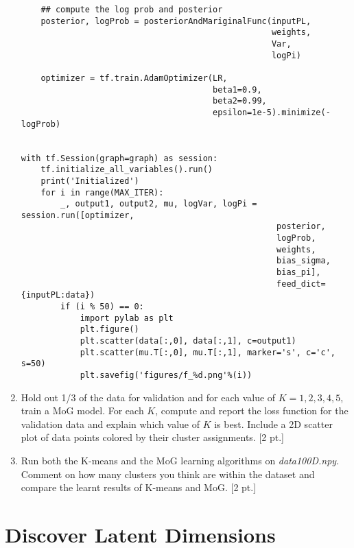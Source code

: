 \documentclass[12pt,letterpaper]{article}
\begin{document}
\begin{enumerate}
\begin{verbatim}
    ## compute the log prob and posterior
    posterior, logProb = posteriorAndMariginalFunc(inputPL, 
                                                   weights, 
                                                   Var, 
                                                   logPi)

    optimizer = tf.train.AdamOptimizer(LR, 
                                       beta1=0.9, 
                                       beta2=0.99, 
                                       epsilon=1e-5).minimize(-logProb)


with tf.Session(graph=graph) as session:
    tf.initialize_all_variables().run()
    print('Initialized')
    for i in range(MAX_ITER):
        _, output1, output2, mu, logVar, logPi = session.run([optimizer, 
                                                    posterior, 
                                                    logProb, 
                                                    weights, 
                                                    bias_sigma, 
                                                    bias_pi], 
                                                    feed_dict={inputPL:data})
        if (i % 50) == 0:
            import pylab as plt
            plt.figure()
            plt.scatter(data[:,0], data[:,1], c=output1)
            plt.scatter(mu.T[:,0], mu.T[:,1], marker='s', c='c', s=50)
            plt.savefig('figures/f_%d.png'%(i))
\end{verbatim}




\item Hold out 1/3 of the data for validation and for each value of $K={1,2,3,4,5}$, train a MoG model. For each $K$, compute and report the loss function for the validation data and explain which value of $K$ is best. Include a 2D scatter plot of data points colored by their cluster assignments. [2 pt.] 

\item Run both the K-means and the MoG learning algorithms on \textit{data100D.npy}. Comment on how many clusters you think are within the dataset and compare the learnt results of K-means and MoG.  [2 pt.] 
\end{enumerate}



\section{Discover Latent Dimensions }
\end{document}

